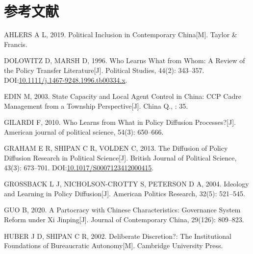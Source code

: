 \documentclass[
  12pt,
]{ctexart}
\newlength{\cslhangindent}
\newlength{\cslentryspacingunit} %
\newenvironment{CSLReferences}[2] %
 {%
  \setlength{\parindent}{0pt}
  \ifodd #1
  \let\oldpar\par
  \def\par{\hangindent=\cslhangindent\oldpar}
  \fi
  \setlength{\parskip}{#2\cslentryspacingunit}
 }%
 {}
\begin{document}
\newpage

\hypertarget{ux53c2ux8003ux6587ux732e}{%
\section*{参考文献}\label{ux53c2ux8003ux6587ux732e}}

\hypertarget{refs}{}
\begin{CSLReferences}{1}{0}
\leavevmode{}%
AHLERS A L, 2019. Political Inclusion in Contemporary {China}{[}M{]}. {Taylor \& Francis}.

\leavevmode{}%
DOLOWITZ D, MARSH D, 1996. Who {Learns What} from {Whom}: A {Review} of the {Policy Transfer Literature}{[}J{]}. Political Studies, 44(2): 343--357. DOI:\href{https://doi.org/10.1111/j.1467-9248.1996.tb00334.x}{10.1111/j.1467-9248.1996.tb00334.x}.

\leavevmode{}%
EDIN M, 2003. State Capacity and Local Agent Control in {China}: {CCP} Cadre Management from a Township Perspective{[}J{]}. China Q., : 35.

\leavevmode{}%
GILARDI F, 2010. Who Learns from What in Policy Diffusion Processes?{[}J{]}. American journal of political science, 54(3): 650--666.

\leavevmode{}%
GRAHAM E R, SHIPAN C R, VOLDEN C, 2013. The {Diffusion} of {Policy Diffusion Research} in {Political Science}{[}J{]}. British Journal of Political Science, 43(3): 673--701. DOI:\href{https://doi.org/10.1017/S0007123412000415}{10.1017/S0007123412000415}.

\leavevmode{}%
GROSSBACK L J, NICHOLSON-CROTTY S, PETERSON D A, 2004. Ideology and Learning in Policy Diffusion{[}J{]}. American Politics Research, 32(5): 521--545.

\leavevmode{}%
GUO B, 2020. A {Partocracy} with {Chinese Characteristics}: Governance {System Reform} under {Xi Jinping}{[}J{]}. Journal of Contemporary China, 29(126): 809--823.

\leavevmode{}%
HUBER J D, SHIPAN C R, 2002. Deliberate Discretion?: The Institutional Foundations of Bureaucratic Autonomy{[}M{]}. {Cambridge University Press}.


\end{CSLReferences}
\end{document}
